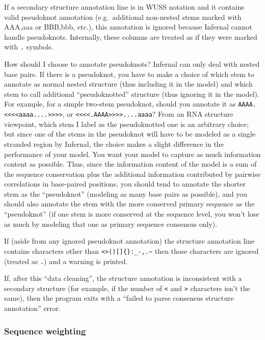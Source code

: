 If a secondary structure annotation line is in WUSS notation and it
contains valid pseudoknot annotation (e.g.\ additional non-nested
stems marked with AAA,aaa or BBB,bbb, etc.), this annotation is
ignored because Infernal cannot handle
pseudoknots. Internally, these columns are treated as if they were
marked with \verb+.+ symbols.

\begin{srefaq}{How should I choose to annotate pseudoknots?} 
Infernal can only deal with nested base pairs. If there is
a pseudoknot, you have to make a choice of which stem to annotate as
normal nested structure (thus including it in the model) and which
stem to call additional ``pseudoknotted'' structure (thus ignoring it
in the model). For example, for a simple two-stem pseudoknot, should
you annotate it as \verb+AAAA.<<<<aaaa....>>>>+, or
\verb+<<<<.AAAA>>>>....aaaa+?  From an RNA structure viewpoint, which
stem I label as the pseudoknotted one is an arbitrary choice; but
since one of the stems in the pseudoknot will have to be modeled as a
single stranded region by Infernal, the choice makes a
slight difference in the performance of your model. You want your
model to capture as much information content as possible.  Thus, since
the information content of the model is a sum of the sequence
conservation plus the additional information contributed by pairwise
correlations in base-paired positions, you should tend to annotate the
shorter stem as the ``pseudoknot'' (modeling as many base pairs as
possible), and you should also annotate the stem with the more
conserved primary sequence as the ``pseudoknot'' (if one stem is more
conserved at the sequence level, you won't lose as much by modeling
that one as primary sequence consensus only).
\end{srefaq}

If (aside from any ignored pseudoknot annotation) the structure
annotation line contains characters other than \verb+<>()[]{}:_-,.~+
then those characters are ignored (treated as \verb+.+) and a warning
is printed.

If, after this ``data cleaning'', the structure annotation is
inconsistent with a secondary structure (for example, if the number of
\verb+<+ and \verb+>+ characters isn't the same), then the program
exits with a ``failed to parse consensus structure annotation'' error.

\subsubsection{Sequence weighting}

